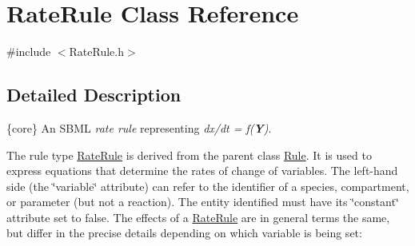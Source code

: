 \hypertarget{class_rate_rule}{}\section{Rate\+Rule Class Reference}
\label{class_rate_rule}


{\ttfamily \#include $<$Rate\+Rule.\+h$>$}



\subsection{Detailed Description}
\{core\} An S\+B\+ML {\itshape rate rule} representing {\itshape dx/dt = f({\bfseries Y})}.

The rule type \hyperlink{class_rate_rule}{Rate\+Rule} is derived from the parent class \hyperlink{class_rule}{Rule}. It is used to express equations that determine the rates of change of variables. The left-\/hand side (the \char`\"{}variable\char`\"{} attribute) can refer to the identifier of a species, compartment, or parameter (but not a reaction). The entity identified must have its \char`\"{}constant\char`\"{} attribute set to {\ttfamily false}. The effects of a \hyperlink{class_rate_rule}{Rate\+Rule} are in general terms the same, but differ in the precise details depending on which variable is being set\+:


